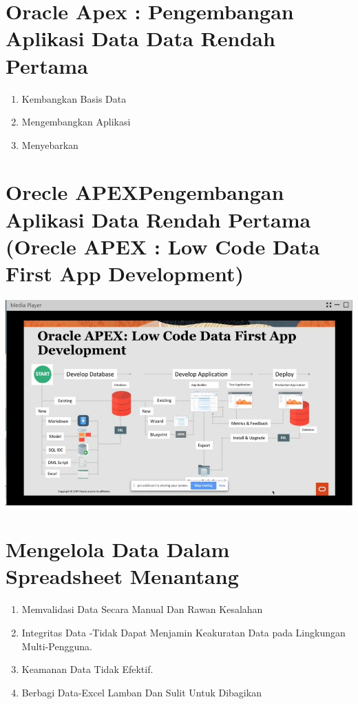 \documentclass{article}
\begin{document}
\section{Oracle Apex : Pengembangan Aplikasi Data Data Rendah Pertama}
\begin{enumerate}

    \item Kembangkan Basis Data
    \item Mengembangkan Aplikasi
    \item Menyebarkan
    
\end{enumerate}
\section{Orecle APEXPengembangan Aplikasi Data Rendah Pertama
(Orecle APEX : Low Code Data First App Development)}

\begin{center}
    \includegraphics[width=10cm\textwidth]{gambar/low data.jpg}
    \end{center}
    \newpage
\section{Mengelola Data Dalam Spreadsheet Menantang}
\begin{enumerate}
    \item Memvalidasi Data Secara Manual Dan Rawan Kesalahan
\item Integritas Data -Tidak Dapat Menjamin Keakuratan Data pada Lingkungan Multi-Pengguna.
\item Keamanan Data Tidak Efektif.
\item Berbagi Data-Excel Lamban Dan Sulit Untuk Dibagikan
\end{enumerate}
\end{document}
